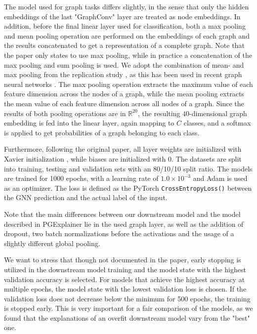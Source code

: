 The model used for graph tasks differs slightly, in the sense that only the hidden embeddings of the last "GraphConv" layer are treated as node embeddings. In addition, before the final linear layer used for classification, both a max pooling and mean pooling operation are performed on the embeddings of each graph and the results concatenated to get a representation of a complete graph. Note that the paper only states to use max pooling, while in practice a concatenation of the max pooling and sum pooling is used. We adopt the combination of mean- and max pooling from the replication study \cite{holdijk2021re}, as this has been used in recent graph neural networks \cite{simonovsky2017dynamic} \cite{ma2021unsupervised} \cite{zhao2023faithful}. The max pooling operation extracts the maximum value of each feature dimension across the nodes of a graph, while the mean pooling extracts the mean value of each feature dimension across all nodes of a graph. Since the results of both pooling operations are in $\mathbb{R}^{20}$, the resulting $40$-dimensional graph embedding is fed into the linear layer, again mapping to $C$ classes, and a softmax is applied to get probabilities of a graph belonging to each class.\bigskip



Furthermore, following the original paper, all layer weights are initialized with Xavier initialization \cite{glorot2010understanding}, while biases are initialized with $0$. The datasets are split into training, testing and validation sets with an 80/10/10 split ratio. The models are trained for 1000 epochs, with a learning rate of $1.0 \times 10^{-3}$ and Adam \cite{kingma2014adam} is used as an optimizer. The loss is defined as the PyTorch \verb|CrossEntropyLoss()| between the GNN prediction and the actual label of the input.

Note that the main differences between our downstream model and the model described in PGExplainer \cite{luo2020parameterized} lie in the used graph layer, as well as the addition of dropout, two batch normalizations before the activations and the usage of a slightly different global pooling.

We want to stress that though not documented in the paper, early stopping is utilized in the downstream model training and the model state with the highest validation accuracy is selected. For models that achieve the highest accuracy at multiple epochs, the model state with the lowest validation loss is chosen. If the validation loss does not decrease below the minimum for 500 epochs, the training is stopped early. This is very important for a fair comparison of the models, as we found that the explanations of an overfit downstream model vary from the "best" one.\bigskip


